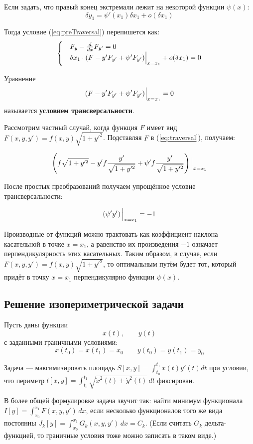 \documentclass[12pt]{article}
\begin{document}
			Если задать, что правый конец экстремали лежит на некоторой функции $\psi(x)$:
			$$\delta y_1 = \psi'(x_1) \delta x_1 + o(\delta x_1)$$

			Тогда условие (\ref{eq:preTraversal}) перепишется как:
			$$
				\begin{cases}
					&F_y - \frac{d}{dx} F_{y'} = 0 \\
					&\delta x_1 \cdot (F - y'F_{y'} + \psi' F_{y'})\Big|_{x=x_1}^{} + o(\delta x_1) = 0
				\end{cases} 
			$$

			Уравнение
			\begin{equation}
				\label{eq:traversal}
				(F - y' F_{y'} + \psi' F_{y'})\Big|_{x=x_1}^{} = 0
			\end{equation}
			называется \textbf{условием трансверсальности}.

			Рассмотрим частный случай, когда функция $F$ имеет вид $F(x, y, y') = f(x,y) \sqrt{1+y'^2}$.
			Подставляя $F$ в (\ref{eq:traversal}), получаем:

			$$
				\left( f \sqrt{1+y'^2} - y' f \frac{y'}{\sqrt{1+y'^2}} + \psi' f \frac{y'}{\sqrt{1+y'^2}} \right) \Big|_{x=x_1}^{}
			$$

			После простых преобразований получаем упрощённое условие трансверсальности:

			$$\left( \psi' y' \right) \Big|_{x=x_1}^{} = -1$$

			Производные от функций можно трактовать как коэффициент наклона касательной в точке $x=x_1$, а равенство их произведения $-1$ означает перпендикулярность этих касательных. Таким образом, в случае, если $F(x, y, y') = f(x,y) \sqrt{1+y'^2}$, то оптимальным путём будет тот, который придёт в точку $x=x_1$ перпендикулярно функции $\psi(x)$.

	\subsection{Решение изопериметрической задачи}


		Пусть даны функции 
		$$x(t),\qquad y(t)$$
		с заданными граничными условиями:
		$$x(t_0) = x(t_1) = x_0 \qquad y(t_0) = y(t_1) = y_0$$

		Задача --- максимизировать площадь $S[x,y] = \int_{t_0}^{t_1}x(t)y'(t) dt$ при условии, что периметр
		$l[x,y] = \int_{t_0}^{t_1} \sqrt{\dot{x}^2(t) + \dot{y}^2(t)}\,dt$ фиксирован.

		В более общей формулировке задача звучит так: найти минимум функционала
		$I[y] = \int_{x_0}^{x_1} F(x,y,y')\,dx$, если несколько функционалов того же вида постоянны
		$J_k[y] = \int_{x_0}^{x_1} G_k(x,y,y')\,dx = C_k$. (Если считать $G_k$ дельта-функцией, то граничные
		условия тоже можно записать в таком виде.)
\end{document}
